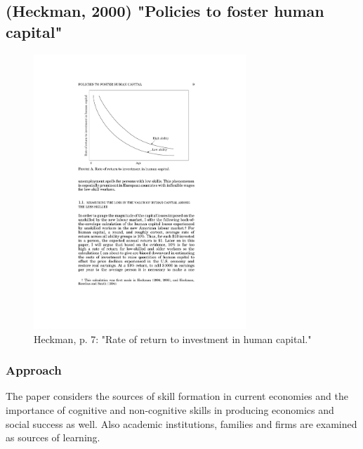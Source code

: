 \documentclass[12pt,a4paper]{article}
\begin{document}
    \subsection{(Heckman, 2000) "Policies to foster human capital"}
    \label{sec:Heckman2000}

    \begin{figure}[htb]
      \centering
      \includegraphics[width=8cm]{Meeting 10 Policies to foster human capital - Seite 7.pdf}
      \caption{Heckman, p. 7: "Rate of return to investment in human capital."}
      \label{fig:Heckman rateofreturnhumancapital}
    \end{figure}

    \subsubsection{Approach}
        The paper considers the sources of skill formation in current economies and the importance of cognitive and non-cognitive skills in producing economics and social success as well. Also academic institutions, families and firms are examined as sources of learning.
\end{document}
